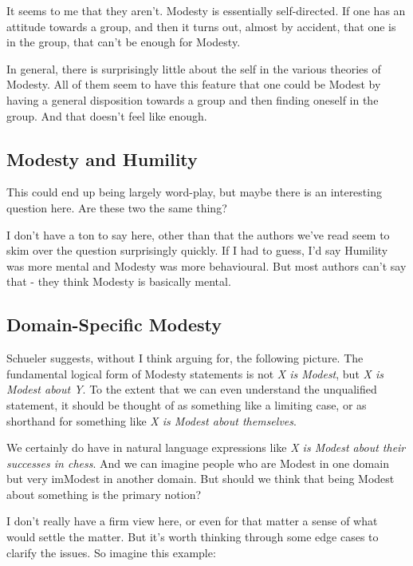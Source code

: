 \documentclass[
]{article}
\begin{document}
It seems to me that they aren't. Modesty is essentially self-directed.
If one has an attitude towards a group, and then it turns out, almost by
accident, that one is in the group, that can't be enough for Modesty.

In general, there is surprisingly little about the self in the various
theories of Modesty. All of them seem to have this feature that one
could be Modest by having a general disposition towards a group and then
finding oneself in the group. And that doesn't feel like enough.

\hypertarget{modesty-and-humility}{%
\subsection{Modesty and Humility}\label{modesty-and-humility}}

This could end up being largely word-play, but maybe there is an
interesting question here. Are these two the same thing?

I don't have a ton to say here, other than that the authors we've read
seem to skim over the question surprisingly quickly. If I had to guess,
I'd say Humility was more mental and Modesty was more behavioural. But
most authors can't say that - they think Modesty is basically mental.

\hypertarget{domain-specific-modesty}{%
\subsection{Domain-Specific Modesty}\label{domain-specific-modesty}}

Schueler suggests, without I think arguing for, the following picture.
The fundamental logical form of Modesty statements is not \emph{X is
Modest}, but \emph{X is Modest about Y}. To the extent that we can even
understand the unqualified statement, it should be thought of as
something like a limiting case, or as shorthand for something like
\emph{X is Modest about themselves}.

We certainly do have in natural language expressions like \emph{X is
Modest about their successes in chess}. And we can imagine people who
are Modest in one domain but very imModest in another domain. But should
we think that being Modest about something is the primary notion?

I don't really have a firm view here, or even for that matter a sense of
what would settle the matter. But it's worth thinking through some edge
cases to clarify the issues. So imagine this example:
\end{document}
